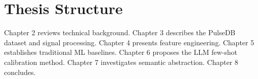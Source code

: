 \section{Thesis Structure}

Chapter 2 reviews technical background. Chapter 3 describes the PulseDB dataset and signal processing. Chapter 4 presents feature engineering. Chapter 5 establishes traditional ML baselines. Chapter 6 proposes the LLM few-shot calibration method. Chapter 7 investigates semantic abstraction. Chapter 8 concludes.
